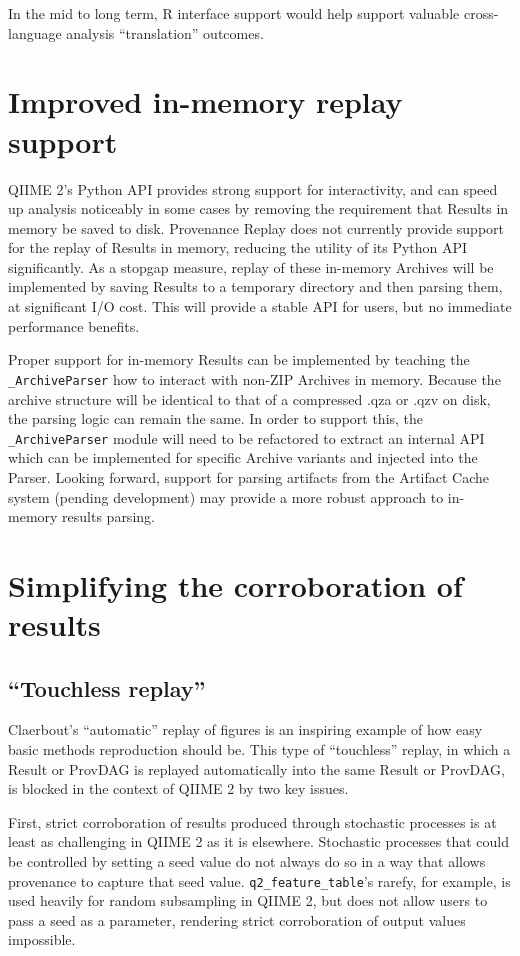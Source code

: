 In the mid to long term, R interface support would help support valuable
cross-language analysis “translation” outcomes.

\section{Improved in-memory replay support \parencite[Issue 22]{keefe_issues_2021}}
QIIME 2’s Python API provides strong support for interactivity, and can speed up
analysis noticeably in some cases by removing the requirement that Results in
memory be saved to disk. Provenance Replay does not currently provide support
for the replay of Results in memory, reducing the utility of its Python API
significantly. As a stopgap measure, replay of these in-memory Archives will be
implemented by saving Results to a temporary directory and then parsing them, at
significant I/O cost. This will provide a stable API for users, but no immediate
performance benefits.

Proper support for in-memory Results can be implemented by teaching the
\texttt{\_ArchiveParser} how to interact with non-ZIP Archives in memory. Because the
archive structure will be identical to that of a compressed .qza or .qzv on
disk, the parsing logic can remain the same. In order to support this, the
\texttt{\_ArchiveParser} module will need to be refactored to extract an internal API
which can be implemented for specific  Archive variants and injected into the
Parser. Looking forward, support for parsing artifacts from the Artifact Cache
system (pending development) may provide a more robust approach to in-memory
results parsing.

\section{Simplifying the corroboration of results}

\subsection{“Touchless replay” \parencite[Issue 63]{keefe_issues_2021}}
\label{touchless_replay}

Claerbout’s “automatic” replay of figures is an inspiring example of how easy
basic methods reproduction should be. This type of “touchless” replay, in which
a Result or ProvDAG is replayed automatically into the same Result or ProvDAG,
is blocked in the context of QIIME 2 by two key issues.

First, strict corroboration of results produced through stochastic processes is
at least as challenging in QIIME 2 as it is elsewhere. Stochastic processes that
could be controlled by setting a seed value do not always do so in a way that
allows provenance to capture that seed value. \texttt{q2\_feature\_table}’s rarefy, for
example, is used heavily for random subsampling in QIIME 2, but does not allow
users to pass a seed as a parameter, rendering strict corroboration of output
values impossible.

